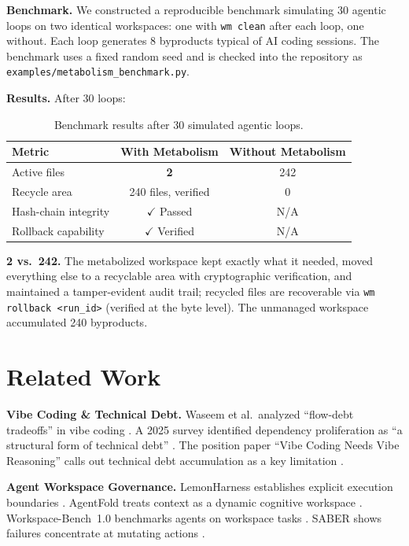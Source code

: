 \documentclass[sigconf,anonymous]{acmart}
\begin{document}
\textbf{Benchmark.} We constructed a reproducible benchmark simulating 30 agentic loops on two identical workspaces: one with \texttt{wm clean} after each loop, one without. Each loop generates 8 byproducts typical of AI coding sessions. The benchmark uses a fixed random seed and is checked into the repository as \texttt{examples/metabolism\_benchmark.py}.

\textbf{Results.} After 30 loops:
\begin{table}[h]
\caption{Benchmark results after 30 simulated agentic loops.}
\label{tab:results}
\begin{tabular}{lcc}
\textbf{Metric} & \textbf{With Metabolism} & \textbf{Without Metabolism}\\
\hline
Active files & \textbf{2} & 242\\
Recycle area & 240 files, verified & 0\\
Hash-chain integrity & $\checkmark$ Passed & N/A\\
Rollback capability & $\checkmark$ Verified & N/A\\
\end{tabular}
\end{table}

\textbf{2 vs.\ 242.} The metabolized workspace kept exactly what it needed, moved everything else to a recyclable area with cryptographic verification, and maintained a tamper-evident audit trail; recycled files are recoverable via \texttt{wm rollback <run\_id>} (verified at the byte level). The unmanaged workspace accumulated 240 byproducts.

\section{Related Work}
\textbf{Vibe Coding \& Technical Debt.} Waseem et al.\ analyzed ``flow-debt tradeoffs'' in vibe coding \cite{waseem2025}. A 2025 survey identified dependency proliferation as ``a structural form of technical debt'' \cite{vibesurvey2025}. The position paper ``Vibe Coding Needs Vibe Reasoning'' calls out technical debt accumulation as a key limitation \cite{position2025}.

\textbf{Agent Workspace Governance.} LemonHarness establishes explicit execution boundaries \cite{ren2026lemonharness}. AgentFold treats context as a dynamic cognitive workspace \cite{tongyi2025agentfold}. Workspace-Bench~1.0 benchmarks agents on workspace tasks \cite{tang2026workspacebench}. SABER shows failures concentrate at mutating actions \cite{saber2025}.
\end{document}
